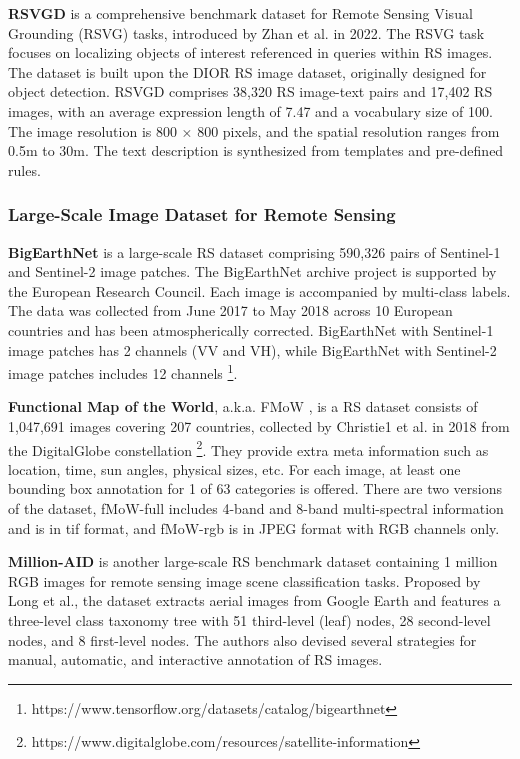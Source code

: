 \documentclass[journal]{IEEEtran}
\begin{document}
\textbf{RSVGD} \cite{rsvg} is a comprehensive benchmark dataset for Remote Sensing Visual Grounding (RSVG) tasks, introduced by Zhan et al. in 2022. The RSVG task focuses on localizing objects of interest referenced in queries within RS images. The dataset is built upon the DIOR RS image dataset, originally designed for object detection. RSVGD comprises 38,320 RS image-text pairs and 17,402 RS images, with an average expression length of 7.47 and a vocabulary size of 100. The image resolution is 800 × 800 pixels, and the spatial resolution ranges from 0.5m to 30m. The text description is synthesized from templates and pre-defined rules.

\subsubsection{Large-Scale Image Dataset for Remote Sensing} \label{large_scale_rs_dataset}

\textbf{BigEarthNet} \cite{bigearthnet} is a large-scale RS dataset comprising 590,326 pairs of Sentinel-1 and Sentinel-2 image patches. The BigEarthNet archive project is supported by the European Research Council. Each image is accompanied by multi-class labels. The data was collected from June 2017 to May 2018 across 10 European countries and has been atmospherically corrected. BigEarthNet with Sentinel-1 image patches has 2 channels (VV and VH), while BigEarthNet with Sentinel-2 image patches includes 12 channels \footnote{https://www.tensorflow.org/datasets/catalog/bigearthnet}.

\textbf{Functional Map of the World}, a.k.a. FMoW \cite{fmow}, is a RS dataset consists of 1,047,691 images covering 207 countries, collected by Christie1 et al. in 2018 from the DigitalGlobe constellation \footnote{https://www.digitalglobe.com/resources/satellite-information}. They provide extra meta information such as location, time, sun angles, physical sizes, etc. For each image, at least one bounding box annotation for 1 of 63 categories is offered. There are two versions of the dataset, fMoW-full includes 4-band and 8-band multi-spectral information and is in tif format, and fMoW-rgb is in JPEG format with RGB channels only.

\textbf{Million-AID} \cite{millionaid} is another large-scale RS benchmark dataset containing 1 million RGB images for remote sensing image scene classification tasks. Proposed by Long et al., the dataset extracts aerial images from Google Earth and features a three-level class taxonomy tree with 51 third-level (leaf) nodes, 28 second-level nodes, and 8 first-level nodes. The authors also devised several strategies for manual, automatic, and interactive annotation of RS images.
\end{document}
